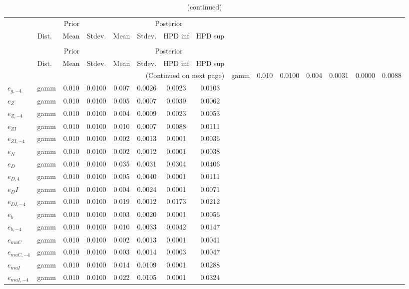  
\begin{center}
\begin{longtable}{llcccccc} 
\caption{Results from Metropolis-Hastings (standard deviation of structural shocks)}
 \label{Table:MHPosterior:2}\\
\toprule 
  & \multicolumn{3}{c}{Prior}  &  \multicolumn{4}{c}{Posterior} \\
  \cmidrule(r{.75em}){2-4} \cmidrule(r{.75em}){5-8}
  & Dist. & Mean  & Stdev. & Mean & Stdev. & HPD inf & HPD sup\\
\midrule \endfirsthead 
\caption{(continued)}\\\toprule 
  & \multicolumn{3}{c}{Prior}  &  \multicolumn{4}{c}{Posterior} \\
  \cmidrule(r{.75em}){2-4} \cmidrule(r{.75em}){5-8}
  & Dist. & Mean  & Stdev. & Mean & Stdev. & HPD inf & HPD sup\\
\midrule \endhead 
\bottomrule \multicolumn{8}{r}{(Continued on next page)} \endfoot 
\bottomrule \endlastfoot 
${e_g}$ & gamm &   0.010 & 0.0100 &   0.004& 0.0031 &  0.0000 &  0.0088 \\ 
${e_{g,-4}}$ & gamm &   0.010 & 0.0100 &   0.007& 0.0026 &  0.0023 &  0.0103 \\ 
${e_Z}$ & gamm &   0.010 & 0.0100 &   0.005& 0.0007 &  0.0039 &  0.0062 \\ 
${e_{Z,-4}}$ & gamm &   0.010 & 0.0100 &   0.004& 0.0009 &  0.0023 &  0.0053 \\ 
${e_{ZI}}$ & gamm &   0.010 & 0.0100 &   0.010& 0.0007 &  0.0088 &  0.0111 \\ 
${e_{ZI,-4}}$ & gamm &   0.010 & 0.0100 &   0.002& 0.0013 &  0.0001 &  0.0036 \\ 
${e_N}$ & gamm &   0.010 & 0.0100 &   0.002& 0.0012 &  0.0001 &  0.0038 \\ 
${e_D}$ & gamm &   0.010 & 0.0100 &   0.035& 0.0031 &  0.0304 &  0.0406 \\ 
${e_{D,4}}$ & gamm &   0.010 & 0.0100 &   0.005& 0.0040 &  0.0001 &  0.0111 \\ 
${e_DI}$ & gamm &   0.010 & 0.0100 &   0.004& 0.0024 &  0.0001 &  0.0071 \\ 
${e_{DI,-4}}$ & gamm &   0.010 & 0.0100 &   0.019& 0.0012 &  0.0173 &  0.0212 \\ 
${e_b}$ & gamm &   0.010 & 0.0100 &   0.003& 0.0020 &  0.0001 &  0.0056 \\ 
${e_{b,-4}}$ & gamm &   0.010 & 0.0100 &   0.010& 0.0033 &  0.0042 &  0.0147 \\ 
${e_{muC}}$ & gamm &   0.010 & 0.0100 &   0.002& 0.0013 &  0.0001 &  0.0041 \\ 
${e_{muC,-4}}$ & gamm &   0.010 & 0.0100 &   0.003& 0.0014 &  0.0003 &  0.0047 \\ 
${e_{muI}}$ & gamm &   0.010 & 0.0100 &   0.014& 0.0109 &  0.0001 &  0.0288 \\ 
${e_{muI,-4}}$ & gamm &   0.010 & 0.0100 &   0.022& 0.0105 &  0.0001 &  0.0324 \\ 
\end{longtable}
 \end{center}
